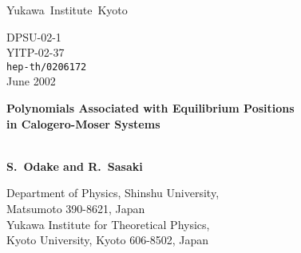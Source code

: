 \documentclass[a4paper,12pt]{article}
\begin{document}
\baselineskip=20pt

\providecommand{\preprint}{
   \begin{flushleft}
     \elevenmib Yukawa\, Institute\, Kyoto\\
   \end{flushleft}\vspace{-1.3cm}
   \begin{flushright}\normalsize  \sf
     DPSU-02-1\\
     YITP-02-37\\
     {\tt hep-th/0206172} \\ June 2002
   \end{flushright}}
\providecommand{\Title}[1]{{\baselineskip=26pt
   \begin{center} \Large \bf #1 \\ \ \\ \end{center}}}
\providecommand{\Author}{\begin{center}
   \large \bf S.~Odake\myHighlight{${}^a$}\coordHE{} and R.~Sasaki\myHighlight{${}^b$}\coordHE{} \end{center}}
\providecommand{\Address}{\begin{center}
     \myHighlight{$^a$}\coordHE{} Department of Physics, Shinshu University,\\
     Matsumoto 390-8621, Japan\\
     \myHighlight{${}^b$}\coordHE{} Yukawa Institute for Theoretical Physics,\\
     Kyoto University, Kyoto 606-8502, Japan
   \end{center}}
\providecommand{\Accepted}[1]{\begin{center}
   {\large \sf #1}\\ \vspace{1mm}{\small \sf Accepted for Publication}
   \end{center}}

\preprint
\thispagestyle{empty}
\bigskip\bigskip\bigskip

\Title{Polynomials Associated with Equilibrium Positions\\
   in Calogero-Moser Systems}
\Author

\Address
\vspace{1cm}
\end{document}
